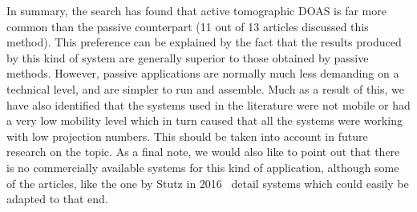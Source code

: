 In summary, the search has found that active tomographic \gls{DOAS} is
far more common than the passive counterpart (11 out of 13 articles
discussed this method). This preference can be explained by the fact
that the results produced by this kind of system are generally superior
to those obtained by passive methods. However, passive applications are
normally much less demanding on a technical level, and are simpler to
run and assemble.  Much as a result of this, we have also identified
that the systems used in the literature were not mobile or had a very
low mobility level which in turn caused that all the systems were
working with low projection numbers. This should be taken into account
in future research on the topic. As a final note, we would also like to
point out that there is no commercially available systems for this kind
of application, although some of the articles, like the one by Stutz in
2016~\cite{Stutz2016} detail systems which could easily be adapted to
that end.

